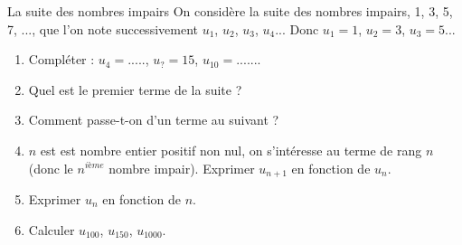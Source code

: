 \begin{myact}{La suite des nombres impairs}
	On considère la suite des nombres impairs, 1, 3, 5, 7, ..., que l'on note successivement $u_1$, $u_2$, $u_3$, $u_4$...
	Donc $u_1=1$, $u_2=3$, $u_3=5$...\\
	
	
		\begin{enumerate}
			\item Compléter : $u_4=.....$, $u_? =15$, $u_{10}=......$.
			\item Quel est le premier terme de la suite ?
			\item Comment passe-t-on d'un terme au suivant ?
			\item $n$ est est nombre entier positif non nul, on s'intéresse au terme de rang $n$ (donc le $n^{ième}$ nombre impair). Exprimer $u_{n+1}$ en fonction de $u_n$.
			\item Exprimer $u_n$ en fonction de $n$.
			\item Calculer $u_{100}$, $u_{150}$, $u_{1000}$.
		\end{enumerate} 
		
			
	
\end{myact}
